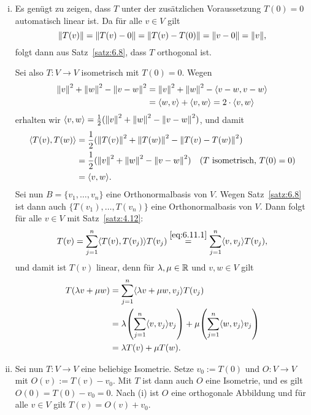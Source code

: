 \begin{beweis} 
	\begin{enumerate}[(i)]
		\item Es genügt zu zeigen, dass $T$ unter der zusätzlichen Voraussetzung $T(0) = 0$ automatisch linear ist.
		Da für alle $v \in V$ gilt
		\[
			\no{T(v)} = \no{T(v) - 0} = \no{T(v) - T(0)} = \no{v-0} = \no{v},
		\]
		folgt dann aus Satz~\ref{satz:6.8}, dass $T$ orthogonal ist.
		
		Sei also $T \colon V \rightarrow V$ isometrisch mit $T(0) = 0$.
		Wegen
		\begin{align*}
			\left\lVert v\right\rVert^2 + \left\lVert w\right\rVert^2 - \left\lVert v-w\right\rVert^2 &= \left\lVert v\right\rVert^2 + \left\lVert w\right\rVert^2 - \left\langle v-w,v-w\right\rangle \\
			&= \left\langle w,v\right\rangle + \left\langle v,w\right\rangle = 2 \cdot \left\langle v,w\right\rangle
		\end{align*}
		erhalten wir $\left\langle v,w\right\rangle = \frac{1}{2} (\left\lVert v\right\rVert^2 + \left\lVert w\right\rVert^2 - \left\lVert v-w\right\rVert^2)$, und damit
		\begin{equation}
			\begin{aligned}
				\sk{T(v),T(w)} &= \frac{1}{2} (\no{T(v)}^2 + \no{T(w)}^2 - \no{T(v)-T(w)}^2) \\
				&= \frac{1}{2} (\no{v}^2 + \no{w}^2 - \no{v-w}^2) \quad (T \text{ isometrisch, } T(0)=0) \\
				&= \sk{v,w}.
			\end{aligned}
			\label{eq:6.11.1}
		\end{equation}
		Sei nun $B = \{v_1,\dots,v_n\}$ eine Orthonormalbasis von $V$.
		Wegen Satz~\ref{satz:6.8} ist dann auch $\{T(v_1),\dots,T(v_n)\}$ eine Orthonormalbasis von $V$.
		Dann folgt für alle $v \in V$ mit Satz~\ref{satz:4.12}:
		\[
			T(v) = \sum_{j=1}^{n} \sk{T(v),T(v_j)} T(v_j) \stackrel{\eqref{eq:6.11.1}}{=} \sum_{j=1}^{n} \sk{v,v_j} T(v_j),
		\]
		und damit ist $T(v)$ linear, denn für $\lambda,\mu \in \mathbb{R}$ und $v,w \in V$ gilt
		\begin{align*}
			T(\lambda v+\mu w) &= \sum_{j=1}^{n} \sk{\lambda v + \mu w,v_j} T(v_j) \\
			&= \lambda \enb{\sum_{j=1}^{n} \sk{v,v_j} v_j} + \mu \enb{\sum_{j=1}^{n} \sk{w,v_j} v_j} \\
			&= \lambda T(v) + \mu T(w).
		\end{align*}
		\item Sei nun $T \colon V \rightarrow V$ eine beliebige Isometrie.
		Setze $v_0 := T(0)$ und $O\colon V \rightarrow V$ mit $O(v) := T(v) - v_0$.
		Mit $T$ ist dann auch $O$ eine Isometrie, und es gilt $O(0) = T(0) - v_0 = 0$.
		Nach (i) ist $O$ eine orthogonale Abbildung und für alle $v \in V$ gilt $T(v) = O(v) + v_0$. 
	\end{enumerate}
\end{beweis}

